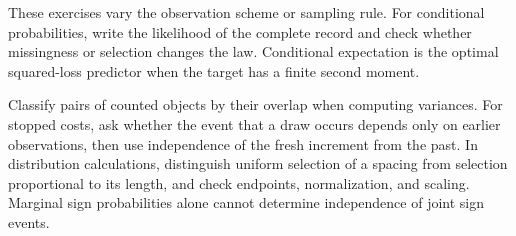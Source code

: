 These exercises vary the observation scheme or sampling rule. For conditional probabilities, write the likelihood of the complete record and check whether missingness or selection changes the law. Conditional expectation is the optimal squared-loss predictor when the target has a finite second moment.

Classify pairs of counted objects by their overlap when computing variances. For stopped costs, ask whether the event that a draw occurs depends only on earlier observations, then use independence of the fresh increment from the past. In distribution calculations, distinguish uniform selection of a spacing from selection proportional to its length, and check endpoints, normalization, and scaling. Marginal sign probabilities alone cannot determine independence of joint sign events.
\par\smallskip
